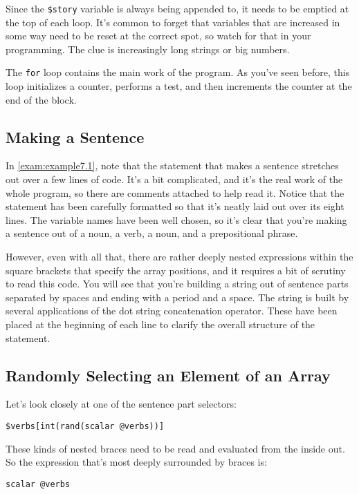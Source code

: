 Since the \verb|$story| variable is always being appended to, it needs to be emptied at the top of each loop. It's common to forget that variables that are increased in some way need to be reset at the correct spot, so watch for that in your programming. The clue is increasingly long strings or big numbers.

The \verb|for| loop contains the main work of the program. As you've seen before, this loop initializes a counter, performs a test, and then increments the counter at the end of the block.

\subsection{Making a Sentence}
In \autoref{exam:example7.1}, note that the statement that makes a sentence stretches out over a few lines of code. It's a bit complicated, and it's the real work of the whole program, so there are comments attached to help read it. Notice that the statement has been carefully formatted so that it's neatly laid out over its eight lines. The variable names have been well chosen, so it's clear that you're making a sentence out of a noun, a verb, a noun, and a prepositional phrase.

However, even with all that, there are rather deeply nested expressions within the square brackets that specify the array positions, and it requires a bit of scrutiny to read this code. You will see that you're building a string out of sentence parts separated by spaces and ending with a period and a space. The string is built by several applications of the dot string concatenation operator. These have been placed at the beginning of each line to clarify the overall structure of the statement. 

\subsection{Randomly Selecting an Element of an Array}
Let's look closely at one of the sentence part selectors:

\begin{lstlisting}
$verbs[int(rand(scalar @verbs))] 
\end{lstlisting}

These kinds of nested braces need to be read and evaluated from the inside out. So the expression that's most deeply surrounded by braces is:

\begin{lstlisting}
scalar @verbs
\end{lstlisting}

